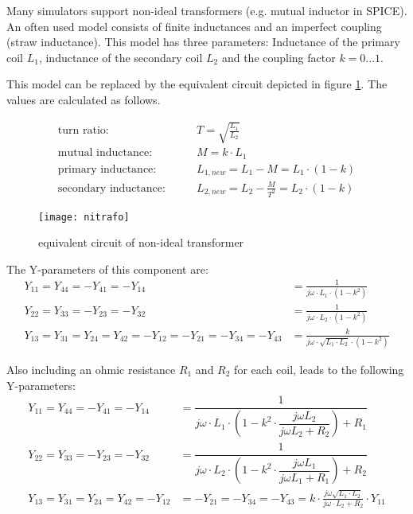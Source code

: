 Many simulators support non-ideal transformers (e.g. mutual inductor
in SPICE).  An often used model consists of finite inductances and an
imperfect coupling (straw inductance).  This model has three
parameters: Inductance of the primary coil $L_1$, inductance of the
secondary coil $L_2$ and the coupling factor $k=0...1$.

\addvspace{12pt}

This model can be replaced by the equivalent circuit depicted in
figure \ref{fig:nitrafo}.  The values are calculated as follows.

\begin{align}
\textrm{turn ratio:} & \qquad  T = \sqrt{\frac{L_1}{L_2}}\\
\textrm{mutual inductance:}  & \qquad M = k\cdot L_1\\
\textrm{primary inductance:}  & \qquad L_{1,new} = L_1 - M = L_1\cdot (1-k)\\
\textrm{secondary inductance:}  & \qquad L_{2,new} = L_2 - \frac{M}{T^2} = L_2\cdot (1-k)
\end{align}

\begin{figure}[ht]
\begin{center}
\texttt{[image: nitrafo]}
\end{center}
\caption{equivalent circuit of non-ideal transformer}
\label{fig:nitrafo}
\end{figure}
\FloatBarrier

The Y-parameters of this component are:
\begin{align}
Y_{11} = Y_{44} = -Y_{41} = -Y_{14} &= \frac{1}{j\omega\cdot L_1\cdot (1-k^2)}\\
Y_{22} = Y_{33} = -Y_{23} = -Y_{32} &= \frac{1}{j\omega\cdot L_2\cdot (1-k^2)}\\
Y_{13} = Y_{31} = Y_{24} = Y_{42} = -Y_{12} = -Y_{21} = -Y_{34} = -Y_{43} &=
  \frac{k}{j\omega\cdot\sqrt{L_1\cdot L_2}\cdot (1-k^2)}
\end{align}

Also including an ohmic resistance $R_1$ and $R_2$ for each coil,
leads to the following Y-parameters:
\begin{align}
Y_{11} = Y_{44} = -Y_{41} = -Y_{14} &
  = \dfrac{1}{j\omega\cdot L_1\cdot \left(1-k^2\cdot\dfrac{j\omega L_2}{j\omega L_2 + R_2}\right) + R_1}\\
Y_{22} = Y_{33} = -Y_{23} = -Y_{32} &
  = \dfrac{1}{j\omega\cdot L_2\cdot \left(1-k^2\cdot\dfrac{j\omega L_1}{j\omega L_1 + R_1}\right) + R_2}\\
Y_{13} = Y_{31} = Y_{24} = Y_{42} = -Y_{12} &= -Y_{21} = -Y_{34} = -Y_{43} =
  k\cdot\frac{j\omega\sqrt{L_1\cdot L_2}}{j\omega\cdot L_2 + R_2}\cdot Y_{11}
\end{align}

